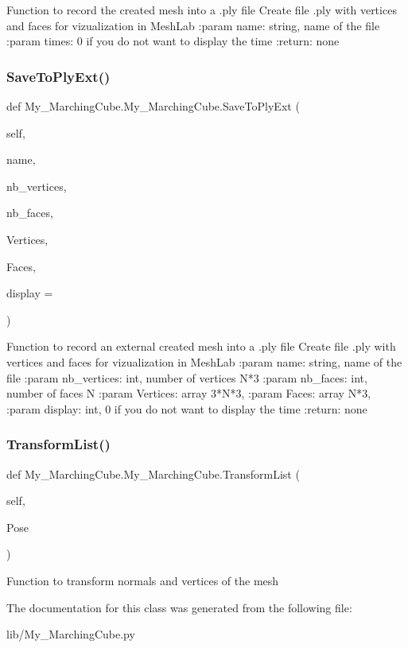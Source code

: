 \begin{DoxyVerb}Function to record the created mesh into a .ply file
Create file .ply with vertices and faces for vizualization in MeshLab
:param name: string, name of the file
:param times: 0 if you do not want to display the time
:return: none
\end{DoxyVerb}
 \mbox{\label{class_my___marching_cube_1_1_my___marching_cube_a9c250e7239f5e6a7f547ee18f0ad6e43}} 
\subsubsection{Save\+To\+Ply\+Ext()}
{\footnotesize\ttfamily def My\+\_\+\+Marching\+Cube.\+My\+\_\+\+Marching\+Cube.\+Save\+To\+Ply\+Ext (\begin{DoxyParamCaption}\item[{}]{self,  }\item[{}]{name,  }\item[{}]{nb\+\_\+vertices,  }\item[{}]{nb\+\_\+faces,  }\item[{}]{Vertices,  }\item[{}]{Faces,  }\item[{}]{display = {} }\end{DoxyParamCaption})}

\begin{DoxyVerb}Function to record an external created mesh into a .ply file
Create file .ply with vertices and faces for vizualization in MeshLab
:param name: string, name of the file
:param nb_vertices: int, number of vertices N*3
:param nb_faces: int, number of faces N
:param Vertices: array 3*N*3,
:param Faces: array N*3,
:param display: int, 0 if you do not want to display the time
:return: none
\end{DoxyVerb}
 \mbox{\label{class_my___marching_cube_1_1_my___marching_cube_a063b11ec768a65b5b73159c6eed61e32}} 
\subsubsection{Transform\+List()}
{\footnotesize\ttfamily def My\+\_\+\+Marching\+Cube.\+My\+\_\+\+Marching\+Cube.\+Transform\+List (\begin{DoxyParamCaption}\item[{}]{self,  }\item[{}]{Pose }\end{DoxyParamCaption})}

\begin{DoxyVerb}    Function to transform normals and vertices of the mesh
\end{DoxyVerb}
 

The documentation for this class was generated from the following file\+:\begin{DoxyCompactItemize}
\item 
lib/My\+\_\+\+Marching\+Cube.\+py\end{DoxyCompactItemize}

